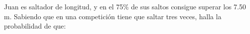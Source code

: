 \documentclass[addpoints,spanish, 12pt,a4paper]{exam}
\begin{document}
\begin{questions}


\question Juan es saltador de longitud, y en el 75\% de sus saltos consigue superar los 7.50 m. Sabiendo que en una competición tiene que saltar tres veces, halla la probabilidad de que:

        

\end{questions}
\end{document}
